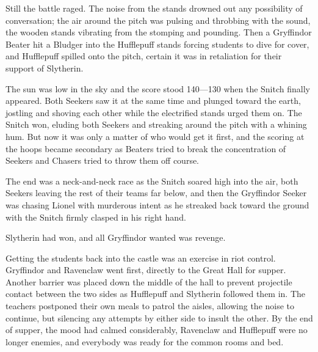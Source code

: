 Still the battle raged. The noise from the stands drowned out any possibility of conversation; the air around the pitch was pulsing and throbbing with the sound, the wooden stands vibrating from the stomping and pounding. Then a Gryffindor Beater hit a Bludger into the Hufflepuff stands forcing students to dive for cover, and Hufflepuff spilled onto the pitch, certain it was in retaliation for their support of Slytherin.

The sun was low in the sky and the score stood 140—130 when the Snitch finally appeared. Both Seekers saw it at the same time and plunged toward the earth, jostling and shoving each other while the electrified stands urged them on. The Snitch won, eluding both Seekers and streaking around the pitch with a whining hum. But now it was only a matter of who would get it first, and the scoring at the hoops became secondary as Beaters tried to break the concentration of Seekers and Chasers tried to throw them off course.

The end was a neck-and-neck race as the Snitch soared high into the air, both Seekers leaving the rest of their teams far below, and then the Gryffindor Seeker was chasing Lionel with murderous intent as he streaked back toward the ground with the Snitch firmly clasped in his right hand.

Slytherin had won, and all Gryffindor wanted was revenge.

Getting the students back into the castle was an exercise in riot control. Gryffindor and Ravenclaw went first, directly to the Great Hall for supper. Another barrier was placed down the middle of the hall to prevent projectile contact between the two sides as Hufflepuff and Slytherin followed them in. The teachers postponed their own meals to patrol the aisles, allowing the noise to continue, but silencing any attempts by either side to insult the other. By the end of supper, the mood had calmed considerably, Ravenclaw and Hufflepuff were no longer enemies, and everybody was ready for the common rooms and bed. 


